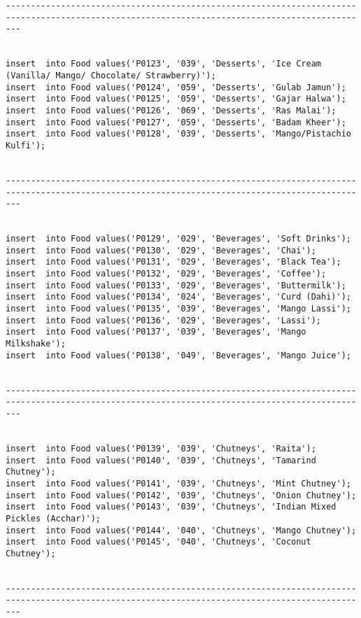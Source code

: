 \documentclass[a4,12pt]{report}
\begin{document}
\begin{lstlisting}
-----------------------------------------------------------------------------------------------------------------------------------------------


insert  into Food values('P0123', '039', 'Desserts', 'Ice Cream (Vanilla/ Mango/ Chocolate/ Strawberry)');
insert  into Food values('P0124', '059', 'Desserts', 'Gulab Jamun');
insert  into Food values('P0125', '059', 'Desserts', 'Gajar Halwa');
insert  into Food values('P0126', '069', 'Desserts', 'Ras Malai');
insert  into Food values('P0127', '059', 'Desserts', 'Badam Kheer');
insert  into Food values('P0128', '039', 'Desserts', 'Mango/Pistachio Kulfi');


-----------------------------------------------------------------------------------------------------------------------------------------------


insert  into Food values('P0129', '029', 'Beverages', 'Soft Drinks');
insert  into Food values('P0130', '029', 'Beverages', 'Chai');
insert  into Food values('P0131', '029', 'Beverages', 'Black Tea');
insert  into Food values('P0132', '029', 'Beverages', 'Coffee');
insert  into Food values('P0133', '029', 'Beverages', 'Buttermilk');
insert  into Food values('P0134', '024', 'Beverages', 'Curd (Dahi)');
insert  into Food values('P0135', '039', 'Beverages', 'Mango Lassi');
insert  into Food values('P0136', '029', 'Beverages', 'Lassi');
insert  into Food values('P0137', '039', 'Beverages', 'Mango Milkshake');
insert  into Food values('P0138', '049', 'Beverages', 'Mango Juice');


-----------------------------------------------------------------------------------------------------------------------------------------------


insert  into Food values('P0139', '039', 'Chutneys', 'Raita');
insert  into Food values('P0140', '039', 'Chutneys', 'Tamarind Chutney');
insert  into Food values('P0141', '039', 'Chutneys', 'Mint Chutney');
insert  into Food values('P0142', '039', 'Chutneys', 'Onion Chutney');
insert  into Food values('P0143', '039', 'Chutneys', 'Indian Mixed Pickles (Acchar)');
insert  into Food values('P0144', '040', 'Chutneys', 'Mango Chutney');
insert  into Food values('P0145', '040', 'Chutneys', 'Coconut Chutney');


-----------------------------------------------------------------------------------------------------------------------------------------------

\end{lstlisting}
\end{document}
